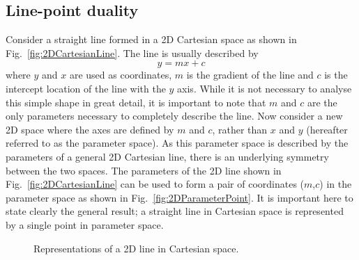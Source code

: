\subsection{Line-point duality}
\label{subsec:LinePointDuality}
Consider a straight line formed in a 2D Cartesian space as shown in Fig.~\ref{fig:2DCartesianLine}.  The line is usually described by
\begin{equation}
  y = mx + c
  \label{eq:2DLineCartesean}
\end{equation}
where $y$ and $x$ are used as coordinates, $m$ is the gradient of the line and $c$ is the intercept location of the line with the $y$ axis.  While it is not necessary to analyse this simple shape in great detail, it is important to note that $m$ and $c$ are the only parameters necessary to completely describe the line.  
\newline
\newline
Now consider a new 2D space where the axes are defined by $m$ and $c$, rather than $x$ and $y$ (hereafter referred to as the parameter space).  As this parameter space is described by the parameters of a general 2D Cartesian line, there is an underlying symmetry between the two spaces.  The parameters of the 2D line shown in Fig.~\ref{fig:2DCartesianLine} can be used to form a pair of coordinates ($m$,$c$) in the parameter space as shown in Fig.~\ref{fig:2DParameterPoint}.  It is important here to state clearly the general result; a straight line in Cartesian space is represented by a single point in parameter space. 
\begin{figure}%
  \centering
  \caption{Representations of a 2D line in Cartesian space.}
  \label{fig:2DCartesianLineAndParameterPoint}
\end{figure}

